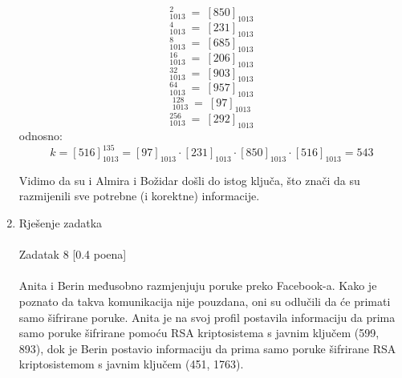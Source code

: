 \documentclass[12pt]{article}
\begin{document}
\begin{enumerate}
\begin{equation*}
    [516]_{1013}^{2}~=~[850]_{1013}
\end{equation*}
\begin{equation*}
    [516]_{1013}^{4}~=~[231]_{1013}
\end{equation*}
\begin{equation*}
    [516]_{1013}^{8}~=~[685]_{1013}
\end{equation*}
\begin{equation*}
    [516]_{1013}^{16}~=~[206]_{1013}
\end{equation*}
\begin{equation*}
    [516]_{1013}^{32}~=~[903]_{1013}
\end{equation*}
\begin{equation*}
    [516]_{1013}^{64}~=~[957]_{1013}
\end{equation*}
\begin{equation*}
    [516]_{1013}^{128}~=~[97]_{1013}
\end{equation*}
\begin{equation*}
    [516]_{1013}^{256}~=~[292]_{1013}
\end{equation*}
odnosno:
\begin{equation*}
    k = [516]_{1013}^{135} = [97]_{1013} \cdot [231]_{1013} \cdot [850]_{1013} \cdot [516]_{1013} = 543
\end{equation*}

Vidimo da su i Almira i Božidar došli do istog ključa, što znači da su razmijenili sve potrebne (i korektne) informacije.
		\newpage
		\item Rješenje zadatka \\ 
		\\
		Zadatak 8 [0.4 poena] \\
		\\
Anita i Berin međusobno razmjenjuju poruke preko Facebook-a. Kako je poznato da takva
komunikacija nije pouzdana, oni su odlučili da će primati samo šifrirane poruke. Anita je na
svoj profil postavila informaciju da prima samo poruke šifrirane pomoću RSA kriptosistema s
javnim ključem (599, 893), dok je Berin postavio informaciju da prima samo poruke šifrirane
RSA kriptosistemom s javnim ključem (451, 1763). \\


\end{enumerate}
\end{document}
